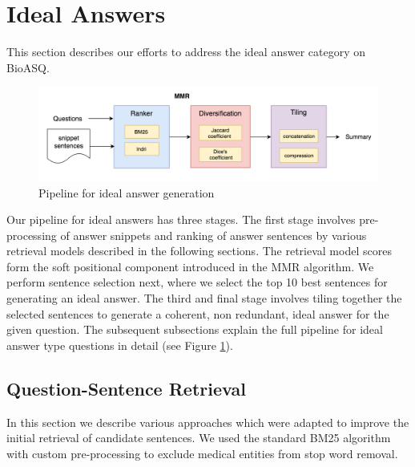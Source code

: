 \documentclass[11pt,a4paper]{article}
\begin{document}
\section{Ideal Answers}
\label{approach1}
This section describes our efforts to address the ideal answer category on BioASQ. %

 \begin{figure}
     \centering
     \includegraphics[scale=0.3]{images/pipeline_summary.png}
     \caption{Pipeline for ideal answer generation}
     \label{fig:ideal_answers_pipeline}
 \end{figure}

Our pipeline for ideal answers has three stages. The first stage involves pre-processing of answer snippets and ranking of answer sentences by various retrieval models described in the following sections. The retrieval model scores form the soft positional component introduced in the MMR algorithm. We perform sentence selection next, where we select the top 10 best sentences for generating an ideal answer. The third and final stage involves tiling together the selected sentences to generate a coherent, non redundant, ideal answer for the given question. 
The subsequent subsections explain the full pipeline for ideal answer type questions in detail (see Figure \ref{fig:ideal_answers_pipeline}).
\subsection{Question-Sentence Retrieval}
In this section we describe various approaches which were adapted to improve the initial retrieval of candidate sentences. We used the standard BM25 algorithm with custom pre-processing to exclude medical entities from stop word removal.  
\end{document}
